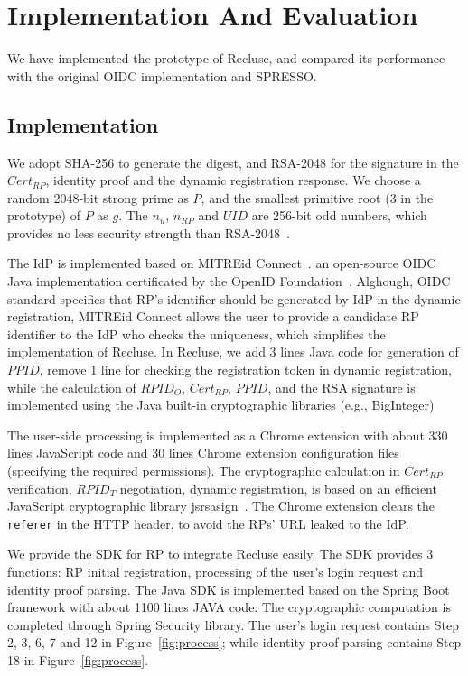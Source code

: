 \section{Implementation And Evaluation}
\label{sec:implementation}
We have implemented the prototype of Recluse, and compared its performance with the original OIDC implementation and SPRESSO.

\subsection{Implementation}
We adopt SHA-256 to generate the digest, and  RSA-2048 for the signature in  the $Cert_{RP}$, identity proof and the dynamic registration response. We  choose a random 2048-bit strong prime as $P$, and the smallest primitive root (3 in the prototype)  of $P$ as $g$. The  $n_u$, $n_{RP}$ and $UID$  are 256-bit odd numbers, which provides no less security strength than RSA-2048~\cite{barkerecommendation}.

The IdP is implemented based on MITREid Connect~\cite{MITREid}. an open-source OIDC Java implementation certificated by the OpenID Foundation~\cite{OIDF}. Alghough, OIDC standard specifies that RP's identifier should be generated by IdP in the dynamic registration, MITREid Connect allows the user to provide a candidate RP identifier to the IdP who checks the uniqueness, which simplifies the implementation of Recluse. In Recluse, we add 3 lines Java code for generation of $PPID$, remove 1 line for checking the registration token in dynamic registration, while the calculation of $RPID_O$, $Cert_{RP}$,  $PPID$, and the RSA signature is implemented using the Java built-in cryptographic libraries (e.g., BigInteger)

The user-side processing is implemented as a Chrome extension with about 330 lines JavaScript code and 30 lines  Chrome extension configuration files (specifying the required permissions). The cryptographic calculation in $Cert_{RP}$ verification, $RPID_T$ negotiation, dynamic registration, is based on an efficient JavaScript cryptographic library  jsrsasign~\cite{jsrsasign}. The Chrome extension clears the \verb+referer+ in the HTTP header, to avoid the RPs' URL leaked to the IdP.


We provide the SDK for RP to integrate Recluse easily. The SDK provides 3 functions:  RP initial registration, processing of the user's login request and  identity proof parsing. The Java SDK is implemented based on the Spring Boot framework  with about 1100 lines JAVA code. The cryptographic computation is completed through Spring Security library. The user's login request contains Step 2, 3, 6, 7 and 12 in Figure~\ref{fig:process}; while  identity proof parsing contains Step 18 in Figure~\ref{fig:process}.


